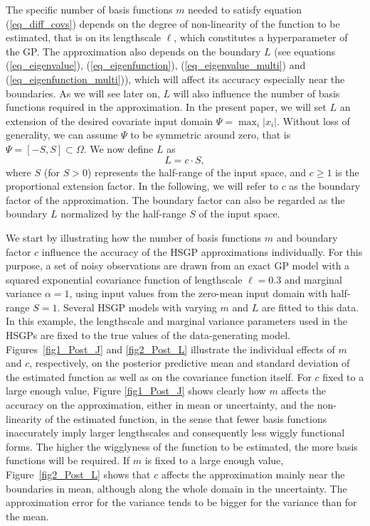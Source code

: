 \documentclass[onecolumn,a4paper,11pt]{article}
\begin{document}
The specific number of basis functions $m$ needed to satisfy equation (\ref{eq_diff_covs}) depends on the degree of non-linearity of the function to be estimated, that is on its lengthscale $\ell$, which constitutes a hyperparameter of the GP. The approximation also depends on the boundary $L$ (see equations (\ref{eq_eigenvalue}), (\ref{eq_eigenfunction}), (\ref{eq_eigenvalue_multi}) and (\ref{eq_eigenfunction_multi})), which will affect its accuracy especially near the boundaries. As we will see later on, $L$ will also influence the number of basis functions required in the approximation. In the present paper, we will set $L$ an extension of the desired covariate input domain $\Psi = \max_{i}|x_i|$. Without loss of generality, we can assume $\Psi$ to be symmetric around zero, that is $\Psi=[-S,S] \subset \Omega$. We now define $L$ as
%
\begin{equation}\label{eq_boundary}
L=c \cdot S,
\end{equation} 
%
where $S$ (for $S > 0$) represents the half-range of the input space, and $c \geq 1$ is the proportional extension factor. In the following, we will refer to $c$ as the boundary factor of the approximation. The boundary factor can also be regarded as the boundary $L$ normalized by the half-range $S$ of the input space.

We start by illustrating how the number of basis functions $m$ and boundary factor $c$ influence the accuracy of the HSGP approximations individually. For this purpose, a set of noisy observations are drawn from an exact GP model with a squared exponential covariance function of lengthscale $\ell=0.3$ and marginal variance $\alpha=1$, using input values from the zero-mean input domain with half-range $S=1$. Several HSGP models with varying $m$ and $L$ are fitted to this data. In this example, the lengthscale and marginal variance parameters used in the HSGPs are fixed to the true values of the data-generating model. 
Figures~\ref{fig1_Post_J} and \ref{fig2_Post_L} illustrate the individual effects of $m$ and $c$, respectively, on the posterior predictive mean and standard deviation of the estimated function as well as on the covariance function itself. For $c$ fixed to a large enough value, Figure \ref{fig1_Post_J} shows clearly how $m$ affects the accuracy on the approximation, either in mean or uncertainty, and the non-linearity of the estimated function, in the sense that fewer basis functions inaccurately imply larger lengthscales and consequently less wiggly functional forms. The higher the wigglyness of the function to be estimated, the more basis functions will be required. If $m$ is fixed to a large enough value, Figure~\ref{fig2_Post_L} shows that $c$ affects the approximation mainly near the boundaries in mean, although along the whole domain in the uncertainty. The approximation error for the variance tends to be bigger for the variance than for the mean.
\end{document}

